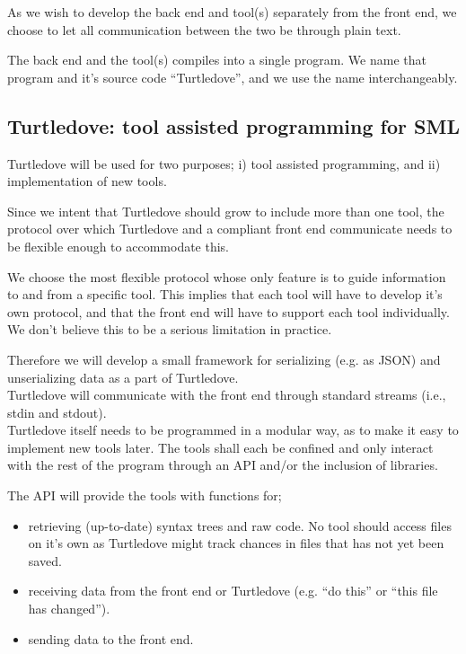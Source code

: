 \documentclass[a4paper,oneside]{article}
\begin{document}
As we wish to develop the back end and tool(s) separately from the front end, we choose to let all
communication between the two be through plain text.

The back end and the tool(s) compiles into a single program. We name that program and it's source
code ``Turtledove'', and we use the name interchangeably.

\subsection{Turtledove: tool assisted programming for SML} 
Turtledove will be used for two purposes; i) tool assisted programming, and ii) implementation of
new tools.

Since we intent that Turtledove should grow to include more than one tool, the
protocol over which Turtledove and a compliant front end communicate needs to be
flexible enough to accommodate this.

We choose the most flexible protocol whose only feature is to guide information to and from a
specific tool. This implies that each tool will have to develop it's own protocol, and that the
front end will have to support each tool individually. We don't believe this to be a serious
limitation in practice.

Therefore we will develop a small framework for serializing (e.g. as JSON) and unserializing data as
a part of Turtledove.
\\

Turtledove will communicate with the front end through standard streams (i.e., stdin and stdout).
\\

Turtledove itself needs to be programmed in a modular way, as to make it easy to implement new tools
later. The tools shall each be confined and only interact with the rest of the program through an
API and/or the inclusion of libraries.

The API will provide the tools with functions for;
\begin{itemize}
\item retrieving (up-to-date) syntax trees and raw code. No tool should access files on it's own as
      Turtledove might track chances in files that has not yet been saved.
\item receiving data from the front end or Turtledove (e.g. ``do this'' or ``this file has changed'').
\item sending data to the front end.
\end{itemize}
\end{document}
